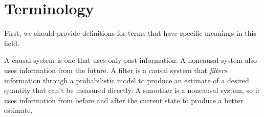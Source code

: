 \section{Terminology}

First, we should provide definitions for terms that have specific meanings in
this field.

A causal system is one that uses only past information. A noncausal system also
uses information from the future. A filter is a causal system that
\textit{filters} information through a probabilistic model to produce an
estimate of a desired quantity that can't be measured directly. A smoother is a
noncausal system, so it uses information from before and after the current state
to produce a better estimate.
